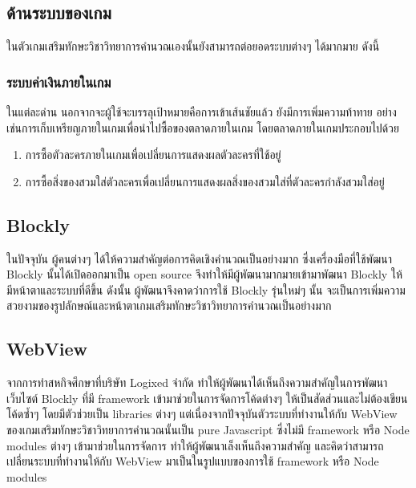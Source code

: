 \subsection{ด้านระบบของเกม}
ในตัวเกมเสริมทักษะวิชาวิทยาการคำนวณเองนั้นยังสามารถต่อยอดระบบต่างๆ ได้มากมาย ดังนี้

\subsubsection{ระบบค่าเงินภายในเกม}
ในแต่ละด่าน นอกจากจะผู้ใช้จะบรรลุเป้าหมายคือการเข้าเส้นชัยแล้ว ยังมีการเพิ่มความท้าทาย อย่างเช่นการเก็บเหรียญภายในเกมเพื่อนำไปซื้อของตลาดภายในเกม 
โดยตลาดภายในเกมประกอบไปด้วย
\begin{enumerate}
    \item การซื้อตัวละครภายในเกมเพื่อเปลี่ยนการแสดงผลตัวละครที่ใช้อยู่
    \item การซื้อสิ่งของสวมใส่ตัวละครเพื่อเปลี่ยนการแสดงผลสิ่งของสวมใส่ที่ตัวละครกำลังสวมใส่อยู่
\end{enumerate}

\subsection{Blockly}
ในปัจจุบัน ผู้คนต่างๆ ได้ให้ความสำคัญต่อการคิดเชิงคำนวณเป็นอย่างมาก ซึ่งเครื่องมือที่ใช้พัฒนา Blockly นั้นได้เปิดออกมาเป็น open source
จึงทำให้มีผู้พัฒนามากมายเข้ามาพัฒนา Blockly ให้มีหน้าตาและระบบที่ดีขึ้น ดังนั้น ผู้พัฒนาจึงคาดว่าการใช้ Blockly รุ่นใหม่ๆ นั้น
จะเป็นการเพิ่มความสวยงามของรูปลักษณ์และหน้าตาเกมเสริมทักษะวิชาวิทยาการคำนวณเป็นอย่างมาก

\subsection{WebView}
จากการทำสหกิจศึกษาที่บริษัท Logixed จำกัด ทำให้ผู้พัฒนาได้เห็นถึงความสำคัญในการพัฒนาเว็บไซต์ Blockly ที่มี framework เข้ามาช่วยในการจัดการโค้ดต่างๆ ให้เป็นสัดส่วนและไม่ต้องเขียนโค้ดซ้ำๆ โดยมีตัวช่วยเป็น libraries ต่างๆ
แต่เนื่องจากปัจจุบันตัวระบบที่ทำงานให้กับ WebView ของเกมเสริมทักษะวิชาวิทยาการคำนวณนั้นเป็น pure Javascript ซึ่งไม่มี framework หรือ Node modules ต่างๆ เข้ามาช่วยในการจัดการ
ทำให้ผู้พัฒนาเล็งเห็นถึงความสำคัญ และคิดว่าสามารถเปลี่ยนระบบที่ทำงานให้กับ WebView มาเป็นในรูปแบบของการใช้ framework หรือ Node modules

